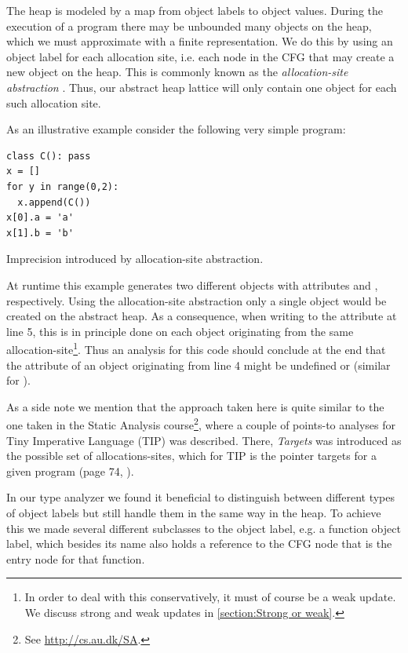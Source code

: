 The heap is modeled by a map from object labels to object values. During the execution of a program there may be unbounded many objects on the heap, which we must approximate with a finite representation. We do this by using an object label for each allocation site, i.e. each node in the CFG that may create a new object on the heap. This is commonly known as the \textit{allocation-site abstraction} \cite{recency,aopas}. Thus, our abstract heap lattice will only contain one object for each such allocation site.

As an illustrative example consider the following very simple program:

\begin{listing}[H]
	\begin{verbatim}
class C(): pass
x = []
for y in range(0,2):
  x.append(C())
x[0].a = 'a'
x[1].b = 'b'
	\end{verbatim}
	\caption{Imprecision introduced by allocation-site abstraction.}
\end{listing}

At runtime this example generates two different  objects with attributes  and , respectively. Using the allocation-site abstraction only a single  object would be created on the abstract heap. As a consequence, when writing to the attribute  at line 5, this is in principle done on each object originating from the same allocation-site\footnote{In order to deal with this conservatively, it must of course be a weak update. We discuss strong and weak updates in \autoref{section:Strong or weak}.}. Thus an analysis for this code should conclude at the end that the attribute  of an object originating from line 4 might be undefined or  (similar for ).

As a side note we mention that the approach taken here is quite similar to the one taken in the Static Analysis course\footnote{See \url{http://cs.au.dk/SA}.}, where a couple of points-to analyses for Tiny Imperative Language (TIP) was described. There, \textit{Targets} was introduced as the possible set of allocations-sites, which for TIP is the pointer targets  for a given program (page 74, \cite{sa}).

In our type analyzer we found it beneficial to distinguish between different types of object labels but still handle them in the same way in the heap. To achieve this we made several different subclasses to the object label, e.g. a function object label, which besides its name also holds a reference to the CFG node that is the entry node for that function.


